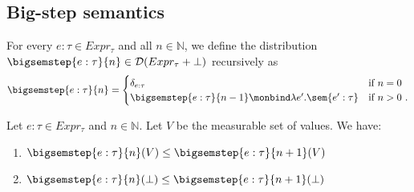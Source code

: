 \subsection{Big-step semantics}
For every $e : \tau \in Expr_{\tau}$ and all $n \in \mathbb{N}$, we define the distribution $\bigsemstep{e : \tau}{n} \in \mathcal{D}(Expr_{\tau} + \bot)$ recursively as
%
\[
	\bigsemstep{e : \tau}{n} = 
	\begin{cases}
		\delta_{e : \tau} & \text{if $n = 0$} \\
		\bigsemstep{e : \tau}{n-1} \monbind  \lambda e'. \sem{e' : \tau} & \text{if $n > 0$}~.
	\end{cases}
\]

\begin{lemma}
	\label{lem:bigstepsem}
	Let $e : \tau \in Expr_{\tau}$ and $n \in \mathbb{N}$. Let $V$ be the measurable set of values. We have:
	\begin{enumerate}
		\item\label{lem:bigstepsem1} $\bigsemstep{e : \tau}{n}(V) \leq \bigsemstep{e : \tau}{n+1}(V)$
		\item\label{lem:bigstepsem2} $\bigsemstep{e : \tau}{n}(\bot) \leq \bigsemstep{e : \tau}{n+1}(\bot)$
	\end{enumerate}
\end{lemma}
%
